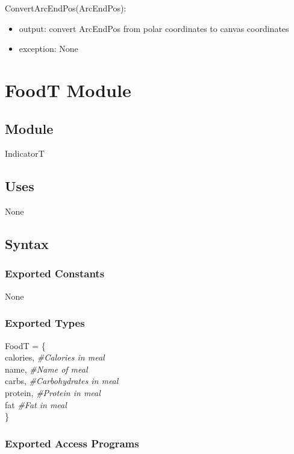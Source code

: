 \documentclass[12pt, titlepage]{article}
\begin{document}
\noindent ConvertArcEndPos(ArcEndPos):
\begin{itemize}
	\item output: convert ArcEndPos from polar coordinates to canvas coordinates 
	\item exception: None 
\end{itemize}

\newpage

\section {FoodT Module} \label{Module} 

\subsection{Module}

IndicatorT

\subsection {Uses}

None

\subsection {Syntax}

\subsubsection {Exported Constants}

None

\subsubsection {Exported Types}

FoodT = \{\\
calories, \textit{\#Calories in meal}\\
name, \textit{\#Name of meal}\\
carbs, \textit{\#Carbohydrates in meal}\\
protein, \textit{\#Protein in meal}\\
fat \textit{\#Fat in meal}\\
\}

\subsubsection {Exported Access Programs}
\end{document}
